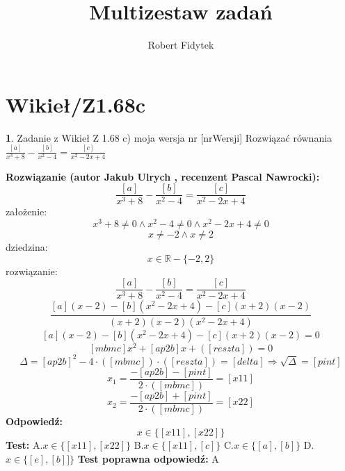 \documentclass[12pt, a4paper]{article}
\title{Multizestaw zadań}
\author{Robert Fidytek}
\date{}
\theoremstyle{definition} %
\newtheorem{zad}{}
\newcommand{\kategoria}[1]{\section{#1}} %
\newcommand{\zadStart}[1]{\begin{zad}#1\newline} %
\newcommand{\zadStop}{\end{zad}}   %
\newcommand{\rozwStart}[2]{\noindent \textbf{Rozwiązanie (autor #1 , recenzent #2): }\newline} %
\newcommand{\rozwStop}{\newline}                                            %
\newcommand{\odpStart}{\noindent \textbf{Odpowiedź:}\newline}    %
\newcommand{\odpStop}{\newline}                                             %
\newcommand{\testStart}{\noindent \textbf{Test:}\newline} %
\newcommand{\testStop}{\newline} %
\newcommand{\kluczStart}{\noindent \textbf{Test poprawna odpowiedź:}\newline} %
\newcommand{\kluczStop}{\newline} %
\begin{document}
\maketitle


\kategoria{Wikieł/Z1.68c}
\zadStart{Zadanie z Wikieł Z 1.68 c) moja wersja nr [nrWersji]}
Rozwiązać równania $\frac{[a]}{x^{3}+8}-\frac{[b]}{x^{2}-4}=\frac{[c]}{x^{2}-2x+4}$
\zadStop
\rozwStart{Jakub Ulrych}{Pascal Nawrocki}
$$\frac{[a]}{x^{3}+8}-\frac{[b]}{x^{2}-4}=\frac{[c]}{x^{2}-2x+4}$$
założenie: $$x^{3}+8\neq0 \land x^{2}-4\neq0 \land x^{2}-2x+4\neq0$$
$$x\neq-2 \land x\neq2$$
dziedzina:$$x\in \mathbb{R}-\{-2,2\}$$
rozwiązanie:$$\frac{[a]}{x^{3}+8}-\frac{[b]}{x^{2}-4}=\frac{[c]}{x^{2}-2x+4}$$
$$\frac{[a](x-2)-[b](x^{2}-2x+4)-[c](x+2)(x-2)}{(x+2)(x-2)(x^{2}-2x+4)}$$
$$[a](x-2)-[b](x^{2}-2x+4)-[c](x+2)(x-2)=0$$
$$[mbmc]x^{2}+[ap2b]x+([reszta])=0$$
$$\Delta=[ap2b]^{2}-4\cdot([mbmc])\cdot([reszta])=[delta]\Rightarrow\sqrt{\Delta}=[pint]$$
$$x_{1}=\frac{-[ap2b]-[pint]}{2\cdot([mbmc])}=[x11]$$
$$x_{2}=\frac{-[ap2b]+[pint]}{2\cdot([mbmc])}=[x22]$$
\rozwStop
\odpStart
$$x\in\{[x11],[x22]\}$$
\odpStop
\testStart
A.$x\in\{[x11],[x22]\}$
B.$x\in\{[x11],[c]\}$
C.$x\in\{[a],[b]\}$
D.$x\in\{[e],[b]]\}$
\testStop
\kluczStart
A
\kluczStop
\end{document}
